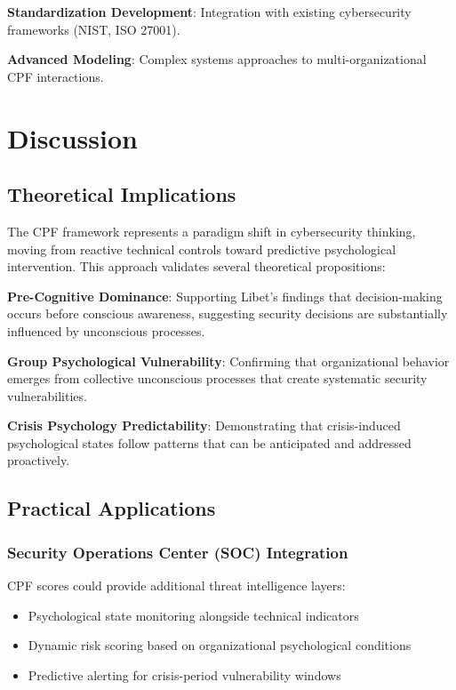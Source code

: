 \documentclass[11pt,a4paper]{article}
\begin{document}
\textbf{Standardization Development}: Integration with existing cybersecurity frameworks (NIST, ISO 27001).

\textbf{Advanced Modeling}: Complex systems approaches to multi-organizational CPF interactions.

\section{Discussion}

\subsection{Theoretical Implications}

The CPF framework represents a paradigm shift in cybersecurity thinking, moving from reactive technical controls toward predictive psychological intervention. This approach validates several theoretical propositions:

\textbf{Pre-Cognitive Dominance}: Supporting Libet's \cite{libet1983} findings that decision-making occurs before conscious awareness, suggesting security decisions are substantially influenced by unconscious processes.

\textbf{Group Psychological Vulnerability}: Confirming that organizational behavior emerges from collective unconscious processes \cite{bion1961} that create systematic security vulnerabilities.

\textbf{Crisis Psychology Predictability}: Demonstrating that crisis-induced psychological states follow patterns that can be anticipated and addressed proactively.

\subsection{Practical Applications}

\subsubsection{Security Operations Center (SOC) Integration}

CPF scores could provide additional threat intelligence layers:
\begin{itemize}
\item Psychological state monitoring alongside technical indicators
\item Dynamic risk scoring based on organizational psychological conditions
\item Predictive alerting for crisis-period vulnerability windows
\end{itemize}
\end{document}
